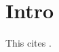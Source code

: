 \documentclass{article}
\begin{document}
\section{Intro}
This cites \cite{knuth84}.


\end{document}
